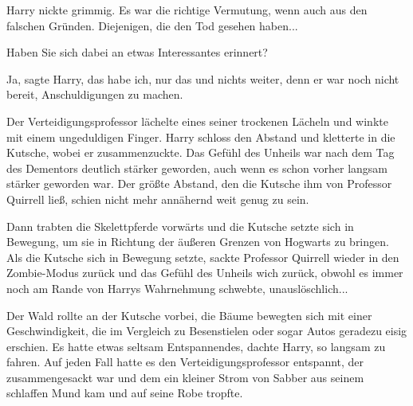 Harry nickte grimmig. Es war die richtige Vermutung, wenn auch aus den falschen
Gründen. Diejenigen, die den Tod gesehen haben...

\glqq{}Haben Sie sich dabei an etwas Interessantes erinnert?\grqq{}

\glqq{}Ja\grqq{}, sagte Harry, \glqq{}das habe ich\grqq{}, nur das und nichts
weiter, denn er war noch nicht bereit, Anschuldigungen zu machen.

Der Verteidigungsprofessor lächelte eines seiner trockenen Lächeln und winkte
mit einem ungeduldigen Finger. Harry schloss den Abstand und kletterte in die
Kutsche, wobei er zusammenzuckte. Das Gefühl des Unheils war nach dem Tag des
Dementors deutlich stärker geworden, auch wenn es schon vorher langsam stärker
geworden war. Der größte Abstand, den die Kutsche ihm von Professor Quirrell
ließ, schien nicht mehr annähernd weit genug zu sein.

Dann trabten die Skelettpferde vorwärts und die Kutsche setzte sich in Bewegung,
um sie in Richtung der äußeren Grenzen von Hogwarts zu bringen. Als die Kutsche
sich in Bewegung setzte, sackte Professor Quirrell wieder in den Zombie-Modus
zurück und das Gefühl des Unheils wich zurück, obwohl es immer noch am Rande von
Harrys Wahrnehmung schwebte, unauslöschlich...

Der Wald rollte an der Kutsche vorbei, die Bäume bewegten sich mit einer
Geschwindigkeit, die im Vergleich zu Besenstielen oder sogar Autos geradezu
eisig erschien. Es hatte etwas seltsam Entspannendes, dachte Harry, so langsam
zu fahren. Auf jeden Fall hatte es den Verteidigungsprofessor entspannt, der
zusammengesackt war und dem ein kleiner Strom von Sabber aus seinem schlaffen
Mund kam und auf seine Robe tropfte.

